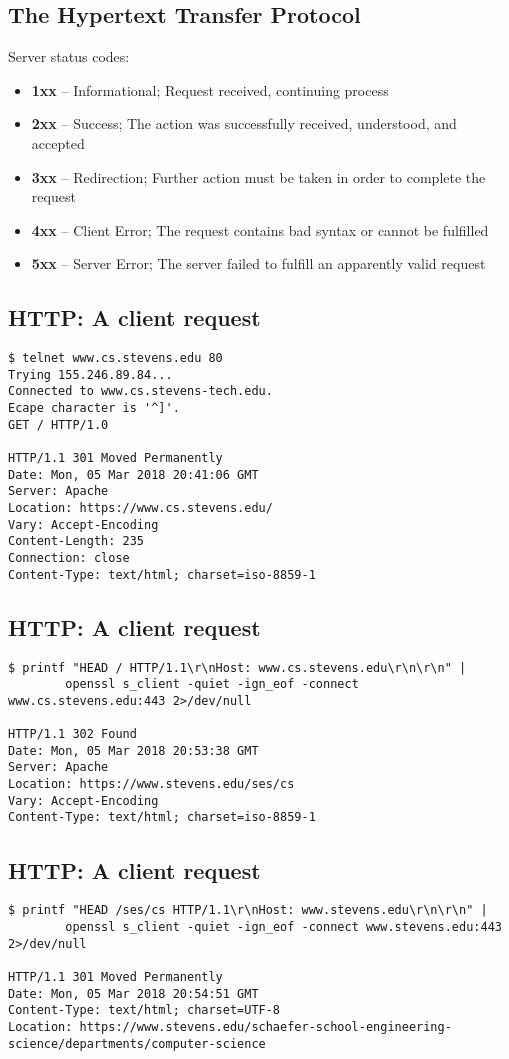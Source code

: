 \documentclass[xga]{xdvislides}
\begin{document}
\subsection{The Hypertext Transfer Protocol}
Server status codes:
\begin{itemize}
	\item {\bf 1xx} -- Informational; Request received, continuing process
	\item {\bf 2xx} -- Success; The action was successfully received,
        understood, and accepted
	\item {\bf 3xx} -- Redirection; Further action must be taken in order to
        complete the request
	\item {\bf 4xx} -- Client Error; The request contains bad syntax or
		cannot be fulfilled
	\item {\bf 5xx} -- Server Error; The server failed to fulfill an
		apparently valid request
\end{itemize}

\subsection{HTTP: A client request}
\smallish
\begin{verbatim}
$ telnet www.cs.stevens.edu 80
Trying 155.246.89.84...
Connected to www.cs.stevens-tech.edu.
Ecape character is '^]'.
GET / HTTP/1.0

HTTP/1.1 301 Moved Permanently
Date: Mon, 05 Mar 2018 20:41:06 GMT
Server: Apache
Location: https://www.cs.stevens.edu/
Vary: Accept-Encoding
Content-Length: 235
Connection: close
Content-Type: text/html; charset=iso-8859-1
\end{verbatim}
\Normalsize

\subsection{HTTP: A client request}
\smallish
\begin{verbatim}
$ printf "HEAD / HTTP/1.1\r\nHost: www.cs.stevens.edu\r\n\r\n" |
        openssl s_client -quiet -ign_eof -connect www.cs.stevens.edu:443 2>/dev/null

HTTP/1.1 302 Found
Date: Mon, 05 Mar 2018 20:53:38 GMT
Server: Apache
Location: https://www.stevens.edu/ses/cs
Vary: Accept-Encoding
Content-Type: text/html; charset=iso-8859-1
\end{verbatim}
\Normalsize

\subsection{HTTP: A client request}
\smallish
\begin{verbatim}
$ printf "HEAD /ses/cs HTTP/1.1\r\nHost: www.stevens.edu\r\n\r\n" |
        openssl s_client -quiet -ign_eof -connect www.stevens.edu:443 2>/dev/null

HTTP/1.1 301 Moved Permanently
Date: Mon, 05 Mar 2018 20:54:51 GMT
Content-Type: text/html; charset=UTF-8
Location: https://www.stevens.edu/schaefer-school-engineering-science/departments/computer-science

\end{verbatim}
\Normalsize
\end{document}
